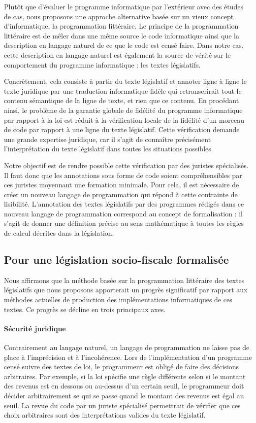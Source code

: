\documentclass[12pt, french]{article}
\begin{document}
Plutôt que d'évaluer le programme informatique par l'extérieur avec des études de cas, nous proposons une approche alternative basée sur un vieux concept d'informatique, la programmation littéraire. Le principe de la programmation littéraire est de mêler dans une même source le code informatique ainsi que la description en langage naturel de ce que le code est censé faire. Dans notre cas, cette description en langage naturel est également la source de vérité sur le comportement du programme informatique : les textes législatifs.

Concrètement, cela consiste à partir du texte législatif et annoter ligne à ligne le texte juridique par une traduction informatique fidèle qui retranscrirait tout le contenu sémantique de la ligne de texte, et rien que ce contenu. En procédant ainsi, le problème de la garantie globale de fidélité du programme informatique par rapport à la loi est réduit à la vérification locale de la fidélité d'un morceau de code par rapport à une ligne du texte législatif. Cette vérification demande une grande expertise juridique, car il s'agit de connaître précisément l'interprétation du texte législatif dans toutes les situations possibles.

Notre objectif est de rendre possible cette vérification par des juristes spécialisés. Il faut donc que les annotations sous forme de code soient compréhensibles par ces juristes moyennant une formation minimale. Pour cela, il est nécessaire de créer un nouveau langage de programmation qui répond à cette contrainte de lisibilité. L'annotation des textes législatifs par des programmes rédigés dans ce nouveau langage de programmation correspond au concept de formalisation : il s'agit de donner une définition précise au sens mathématique à toutes les règles de calcul décrites dans la législation.

\subsection{Pour une législation socio-fiscale formalisée}

Nous affirmons que la méthode basée sur la programmation littéraire des textes législatifs que nous proposons apporterait un progrès significatif par rapport aux méthodes actuelles de production des implémentations informatiques de ces textes. Ce progrès se décline en trois principaux axes.

\paragraph{Sécurité juridique} Contrairement au langage naturel, un langage de programmation ne laisse pas de place à l'imprécision et à l'incohérence. Lors de l'implémentation d'un programme censé suivre des textes de loi, le programmeur est obligé de faire des décisions arbitraires. Par exemple, si la loi spécifie une règle différente selon si le montant des revenus est en dessous ou au-dessus d'un certain seuil, le programmeur doit décider arbitrairement se qui se passe quand le montant des revenus est égal au seuil. La revue du code par un juriste spécialisé permettrait de vérifier que ces choix arbitraires sont des interprétations valides du texte législatif.
\end{document}
